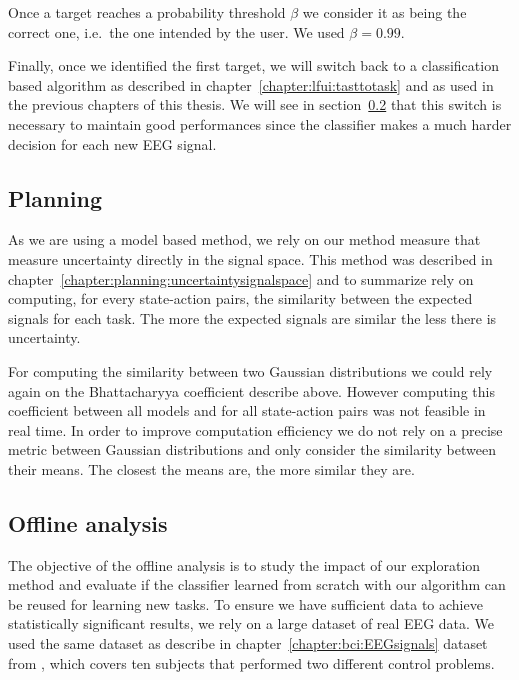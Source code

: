 Once a target reaches a probability threshold $\beta$ we consider it as being the correct one, i.e.\ the one intended by the user. We used $\beta = 0.99$.

Finally, once we identified the first target, we will switch back to a classification based algorithm as described in chapter~\ref{chapter:lfui:tasttotask} and as used in the previous chapters of this thesis. We will see in section~\ref{chapter:limitations:overlap:offline} that this switch is necessary to maintain good performances since the classifier makes a much harder decision for each new EEG signal.

\subsection{Planning}

As we are using a model based method, we rely on our method measure that measure uncertainty directly in the signal space. This method was described in chapter~\ref{chapter:planning:uncertaintysignalspace} and to summarize rely on computing, for every state-action pairs, the similarity between the expected signals for each task. The more the expected signals are similar the less there is uncertainty.

For computing the similarity between two Gaussian distributions we could rely again on the Bhattacharyya coefficient describe above. However computing this coefficient between all models and for all state-action pairs was not feasible in real time. In order to improve computation efficiency we do not rely on a precise metric between Gaussian distributions and only consider the similarity between their means. The closest the means are, the more similar they are.

\subsection{Offline analysis}
\label{chapter:limitations:overlap:offline}

The objective of the offline analysis is to study the impact of our exploration method and evaluate if the classifier learned from scratch with our algorithm can be reused for learning new tasks. To ensure we have sufficient data to achieve statistically significant results, we rely on a large dataset of real EEG data. We used the same dataset as describe in chapter~\ref{chapter:bci:EEGsignals} dataset from \cite{iturrate2013task}, which covers ten subjects that performed two different control problems.

